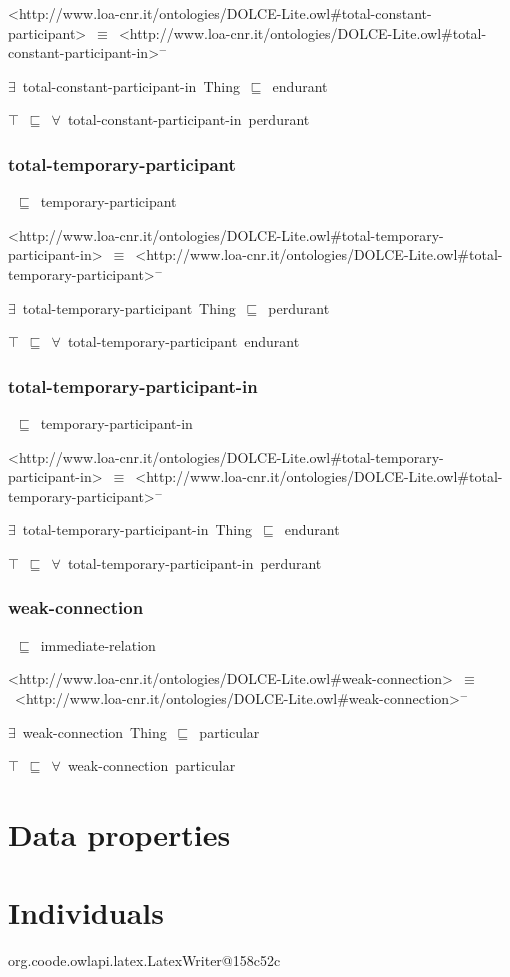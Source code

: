 \documentclass{article}
\begin{document}
<http://www.loa-cnr.it/ontologies/DOLCE-Lite.owl#total-constant-participant>~\ensuremath{\equiv}~<http://www.loa-cnr.it/ontologies/DOLCE-Lite.owl#total-constant-participant-in>\ensuremath{^-}

\ensuremath{\exists}~total-constant-participant-in~Thing~\ensuremath{\sqsubseteq}~endurant

\ensuremath{\top}~\ensuremath{\sqsubseteq}~\ensuremath{\forall}~total-constant-participant-in~perdurant

\subsubsection*{total-temporary-participant}

~\ensuremath{\sqsubseteq}~temporary-participant

<http://www.loa-cnr.it/ontologies/DOLCE-Lite.owl#total-temporary-participant-in>~\ensuremath{\equiv}~<http://www.loa-cnr.it/ontologies/DOLCE-Lite.owl#total-temporary-participant>\ensuremath{^-}

\ensuremath{\exists}~total-temporary-participant~Thing~\ensuremath{\sqsubseteq}~perdurant

\ensuremath{\top}~\ensuremath{\sqsubseteq}~\ensuremath{\forall}~total-temporary-participant~endurant

\subsubsection*{total-temporary-participant-in}

~\ensuremath{\sqsubseteq}~temporary-participant-in

<http://www.loa-cnr.it/ontologies/DOLCE-Lite.owl#total-temporary-participant-in>~\ensuremath{\equiv}~<http://www.loa-cnr.it/ontologies/DOLCE-Lite.owl#total-temporary-participant>\ensuremath{^-}

\ensuremath{\exists}~total-temporary-participant-in~Thing~\ensuremath{\sqsubseteq}~endurant

\ensuremath{\top}~\ensuremath{\sqsubseteq}~\ensuremath{\forall}~total-temporary-participant-in~perdurant

\subsubsection*{weak-connection}

~\ensuremath{\sqsubseteq}~immediate-relation

<http://www.loa-cnr.it/ontologies/DOLCE-Lite.owl#weak-connection>~\ensuremath{\equiv}~<http://www.loa-cnr.it/ontologies/DOLCE-Lite.owl#weak-connection>\ensuremath{^-}

\ensuremath{\exists}~weak-connection~Thing~\ensuremath{\sqsubseteq}~particular

\ensuremath{\top}~\ensuremath{\sqsubseteq}~\ensuremath{\forall}~weak-connection~particular

\section*{Data properties}\section*{Individuals}org.coode.owlapi.latex.LatexWriter@158c52c
\end{document}
